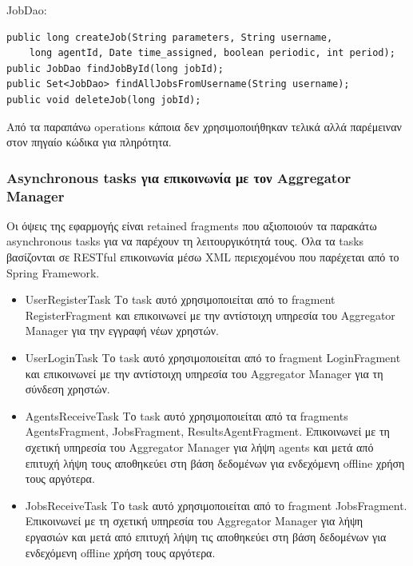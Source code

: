 \documentclass[a4paper,11pt]{article}
\begin{document}
\begin{sloppypar}
\begin{itemize}
\begin{lstlisting}
\end{lstlisting}

JobDao:

\begin{lstlisting}
public long createJob(String parameters, String username,
    long agentId, Date time_assigned, boolean periodic, int period);
public JobDao findJobById(long jobId);
public Set<JobDao> findAllJobsFromUsername(String username);
public void deleteJob(long jobId);
\end{lstlisting}

Από τα παραπάνω operations κάποια δεν χρησιμοποιήθηκαν τελικά αλλά παρέμειναν στον πηγαίο κώδικα για πληρότητα.

\end{itemize}

\newpage

\subsubsection{Asynchronous tasks για επικοινωνία με τον Aggregator Manager}

Οι όψεις της εφαρμογής είναι retained fragments που αξιοποιούν τα παρακάτω asynchronous tasks για να παρέχουν τη λειτουργικότητά τους. Όλα τα tasks βασίζονται σε RESTful επικοινωνία μέσω XML περιεχομένου που παρέχεται από το Spring Framework.

\begin{itemize}

\item UserRegisterTask
\newline
Το task αυτό χρησιμοποιείται από το fragment RegisterFragment και επικοινωνεί με την αντίστοιχη υπηρεσία του Aggregator Manager για την εγγραφή νέων χρηστών.

\item UserLoginTask
\newline
Το task αυτό χρησιμοποιείται από το fragment LoginFragment και επικοινωνεί με την αντίστοιχη υπηρεσία του Aggregator Manager για τη σύνδεση χρηστών.

\item AgentsReceiveTask
\newline
Το task αυτό χρησιμοποιείται από τα fragments AgentsFragment, JobsFragment, ResultsAgentFragment. Επικοινωνεί με τη σχετική υπηρεσία του Aggregator Manager για λήψη agents και μετά από επιτυχή λήψη τους αποθηκεύει στη βάση δεδομένων για ενδεχόμενη offline χρήση τους αργότερα.

\item JobsReceiveTask
\newline
Το task αυτό χρησιμοποιείται από το fragment JobsFragment. Επικοινωνεί με τη σχετική υπηρεσία του Aggregator Manager για λήψη εργασιών και μετά από επιτυχή λήψη τις αποθηκεύει στη βάση δεδομένων για ενδεχόμενη offline χρήση τους αργότερα.


\end{itemize}
\end{sloppypar}
\end{document}
